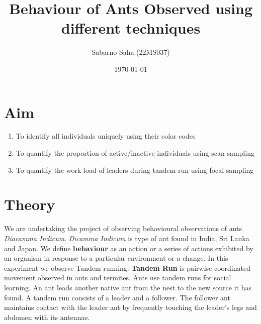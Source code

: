 \documentclass{scrartcl}
\title{Behaviour of Ants Observed using different techniques}
\author{Sabarno Saha (22MS037)}
\date{\today}
\begin{document}
\maketitle
\tableofcontents
\newpage
\section{Aim}
\begin{enumerate}
    \item To identify all individuals uniquely using their color codes
    \item To quantify the proportion of active/inactive individuals using scan sampling
    \item To quantify the work-load of leaders during tandem-run using focal sampling
\end{enumerate}
\section{Theory}
We are undertaking the project of observing behavioural observations of ants \textit{Diacamma Indicum}. 
\textit{Dicamma Indicum} is type of ant found in India, Sri Lanka and Japan. We define 
\textbf{behaviour} as an action or a series of actions exhibited by an organism in response to 
a particular environment or a change. In this experiment we observe Tandem running. 
\textbf{Tandem Run} is pairwise coordinated movement observed in ants and termites. 
Ants use tandem runs for social learning. An ant leads another native ant from the nest to 
the new source it has found. A tandem run consists of a leader and a follower. The follower ant 
maintains contact with the leader ant by frequently touching the leader's legs and abdomen 
with its antennae.
\end{document}
